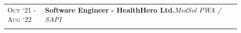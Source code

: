 \documentclass[a4paper,10pt]{extarticle} %
\begin{document}
{\begin{tabular}{>{\raggedright\arraybackslash}p{0.15\linewidth} | >{\raggedright\arraybackslash}p{0.78\linewidth}}
\textsc{Oct ‘21 - Aug ‘22} & \textbf{Software Engineer} \textbf{ - HealthHero Ltd.}\hfill\textit{MedSol PWA / SAPI}\\
\multicolumn{2}{c}{} \\


\end{tabular}}
\end{document}
